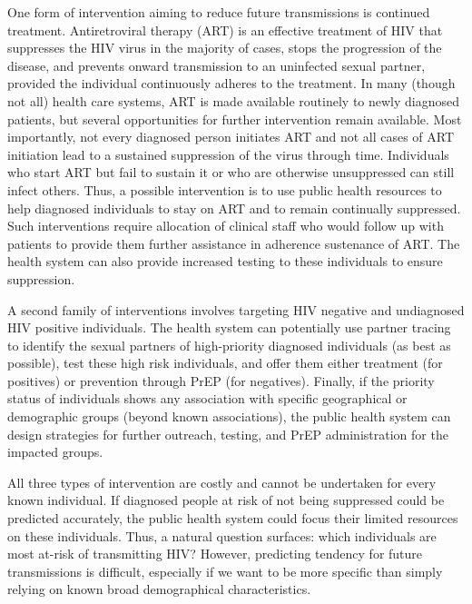 \documentclass[a4paper,11pt]{article}
\begin{document}
One form of intervention aiming to reduce future transmissions is continued treatment. 
Antiretroviral therapy (ART) is an effective treatment of HIV that suppresses the HIV virus in the majority of cases, stops the progression of the disease, and prevents onward transmission to an uninfected sexual partner, provided the individual continuously adheres to the treatment.\supercite{Cohen2011}
In  many (though not all) health care systems, ART is made available routinely  to newly diagnosed patients, but several opportunities for further intervention remain available. 
Most importantly, not every diagnosed person initiates ART and not all cases of ART initiation lead to a sustained suppression of the virus through time. 
Individuals who start ART but fail to sustain it or who are otherwise unsuppressed can still infect others. 
Thus, a possible intervention is to use public health resources to help diagnosed individuals to stay on ART and to remain continually suppressed.\supercite{Poon2016}
Such interventions require allocation of clinical staff who would follow up with patients to provide them further assistance in adherence sustenance of ART.
The health system can also provide  increased testing to these individuals to ensure suppression.  

A second family of interventions involves targeting HIV negative and undiagnosed HIV positive individuals.
The health system can potentially use partner tracing to identify the sexual partners of high-priority diagnosed individuals (as best as possible), test these high risk individuals, and offer them either treatment (for positives) or prevention through PrEP (for negatives).\supercite{Gotz2014} 
Finally, if the  priority status of individuals shows any association with specific geographical or demographic groups (beyond known associations), the public health system can design strategies for further outreach, testing, and PrEP administration for the impacted groups.

All three types of intervention   are  costly and cannot be undertaken for every known individual.
If diagnosed people at risk of not being suppressed could be predicted accurately, the public health system could focus their limited resources on these individuals.
Thus, a natural question surfaces: which individuals are most at-risk of transmitting HIV? %
However, predicting tendency for future transmissions is difficult, especially if we want to be more specific than simply relying on known broad demographical characteristics. 
\end{document}
